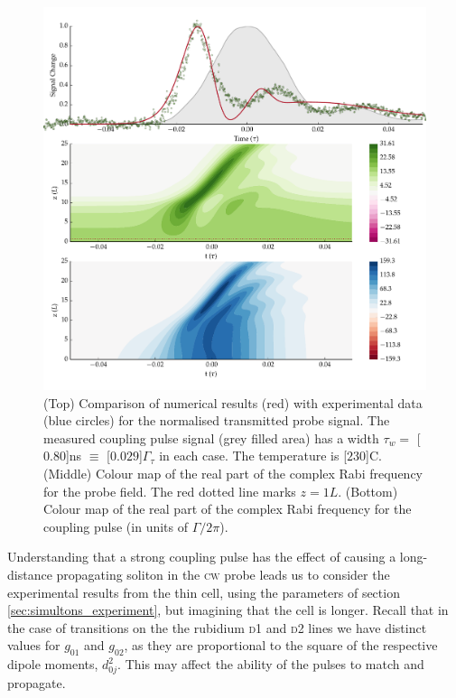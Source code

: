     \begin{figure}
      \includegraphics[width=\linewidth]
        {figs/06_simultons/mb_vee2g_15c_130p_0330t_230C_sb50_120vel010_10_050um_fig1.pdf}
      \caption{
      (Top) Comparison of numerical results (red) with experimental data (blue
      circles) for the normalised transmitted probe signal. The measured coupling
      pulse signal (grey filled area) has a width $\tau_w = $ \unit[$0.80$]{ns} $
      \equiv $ \unit[$0.029$]{$\Gamma_\tau$} in each case. The temperature is
      \unit[$230$]{\textdegree C}. (Middle) Colour map of the real part of the
      complex Rabi frequency for the probe field. The red dotted line marks $z =
      1L$. (Bottom) Colour map of the real part of the complex Rabi frequency for
      the coupling pulse (in units of $\Gamma/2\pi$).
      } 
      \label{fig:exp_result_single} 
    \end{figure}

    Understanding that a strong coupling pulse has the effect of causing a 
    long-distance propagating soliton in the \textsc{cw} probe leads us to consider
    the experimental results from the thin cell, using the parameters of section
    \ref{sec:simultons_experiment}, but imagining that the cell is longer.
    Recall that in the case of transitions on the the rubidium \textsc{d1} and
    \textsc{d2} lines we have distinct values for $g_{01}$ and $g_{02}$, as they
    are proportional to the square of the respective dipole moments, $d_{0j}^2$.
    This may affect the ability of the pulses to match and propagate.

